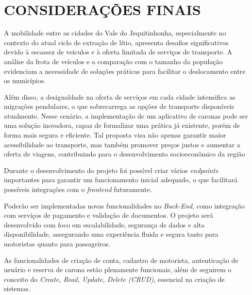 \chapter{CONSIDERAÇÕES FINAIS}

A mobilidade entre as cidades do Vale do Jequitinhonha, especialmente no contexto do atual ciclo de extração de lítio, apresenta desafios significativos devido à escassez de veículos e à oferta limitada de serviços de transporte. A análise da frota de veículos e a comparação com o tamanho da população evidenciam a necessidade de soluções práticas para facilitar o deslocamento entre os municípios.

Além disso, a desigualdade na oferta de serviços em cada cidade intensifica as migrações pendulares, o que sobrecarrega as opções de transporte disponíveis atualmente. Nesse cenário, a implementação de um aplicativo de caronas pode ser uma solução inovadora, capaz de formalizar uma prática já existente, porém de forma mais segura e eficiente. Tal proposta visa não apenas garantir maior acessibilidade ao transporte, mas também promover preços justos e aumentar a oferta de viagens, contribuindo para o desenvolvimento socioeconômico da região

Durante o desenvolvimento do projeto foi possível criar vários \textit{endpoints} importantes para garantir um funcionamento inicial adequado, o que facilitará possíveis integrações com o \textit{frontend} futuramente. 

Poderão ser implementadas novas funcionalidades no \textit{Back-End}, como integração com serviços de pagamento e validação de documentos. O projeto será desenvolvido com foco em escalabilidade, segurança de dados e alta disponibilidade, assegurando uma experiência fluida e segura tanto para motoristas quanto para passageiros.

As funcionalidades de criação de conta, cadastro de motorista, autenticação de usuário e reserva de carona estão plenamente funcionais, além de seguirem o conceito do \textit{Create, Read, Update, Delete (CRUD)}, essencial na criação de sistemas. 
